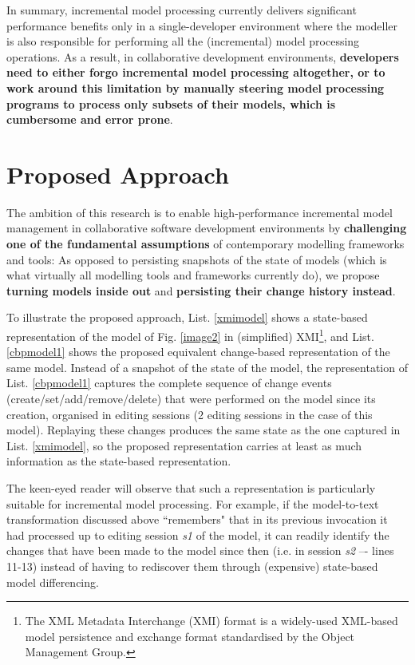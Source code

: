 \documentclass{llncs}
\begin{document}
In summary, incremental model processing currently delivers significant performance benefits only
in a single-developer environment where the modeller is also responsible for performing all the (incremental) model processing operations. As a result, in collaborative development environments,
\textbf{developers need to either forgo incremental model processing altogether, or to work around
this limitation by manually steering model processing programs to process only subsets of
their models, which is cumbersome and error prone}.

\section{Proposed Approach}
\label{Proposed Approach}
The ambition of this research is to enable high-performance incremental model management in collaborative software development environments by \textbf{challenging one of the fundamental assumptions} of contemporary modelling frameworks and tools: As opposed to persisting snapshots of the state of models (which is what virtually all modelling tools and frameworks currently do), we propose \textbf{turning models inside out} and \textbf{persisting their change history instead}.

To illustrate the proposed approach, List. \ref{xmimodel} shows a state-based representation of the model of Fig. \ref{image2} in (simplified) XMI\footnote{The XML Metadata Interchange (XMI) format is a widely-used XML-based model persistence and exchange format standardised by the Object Management Group.}, and List. \ref{cbpmodel1} shows the proposed equivalent change-based representation of the same model. Instead of a snapshot of the state of the model, the representation of List. \ref{cbpmodel1} captures the complete sequence of change events (create/set/add/remove/delete) that were performed on the model since its creation, organised in editing sessions (2 editing sessions in the case of this model). Replaying these changes produces the same state as the one captured in List. \ref{xmimodel}, so the proposed representation carries at least as much information as the state-based representation.

The keen-eyed reader will observe that such a representation is particularly suitable for incremental model processing. For example, if the model-to-text transformation discussed above ``remembers" that in its previous invocation it had processed up to editing session \emph{s1} of the model, it can readily identify the changes that have been made to the model since then (i.e. in session \emph{s2} –- lines 11-13) instead of having to rediscover them through (expensive) state-based model differencing.
\end{document}
